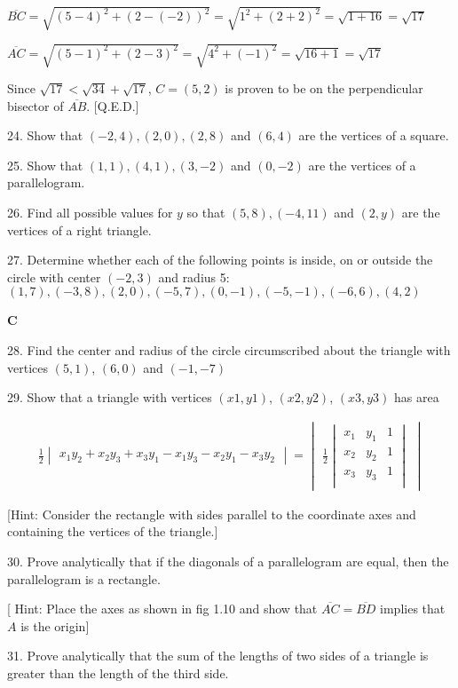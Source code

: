 \documentclass[10pt,letterpaper]{article}
\begin{document}
$\overline{BC}=\sqrt{(5-4)^2+(2-(-2))^2}=\sqrt{1^2+(2+2)^2}=\sqrt{1+16}=\sqrt{17}$

$\overline{AC}=\sqrt{(5-1)^2+(2-3)^2}=\sqrt{4^2+(-1)^2}=\sqrt{16+1}=\sqrt{17}$

Since $\sqrt{17} < \sqrt{34}+\sqrt{17}$, $C=(5,2)$ is proven to be on the perpendicular bisector of $\overline{AB}$. [Q.E.D.]

24. Show that $(-2,4), (2,0), (2,8)$ and $(6,4)$ are the vertices of a square.

25. Show that $(1,1), (4,1), (3,-2)$ and $(0,-2)$ are the vertices of a parallelogram.

26. Find all possible values for $y$ so that $(5,8), (-4,11)$ and $(2,y)$ are the vertices of a right triangle.

27. Determine whether each of the following points is inside, on or outside the circle with center $(-2, 3)$ and radius 5: $(1,7), (-3,8), (2,0), (-5,7), (0,-1), (-5,-1), (-6,6), (4,2)$

\textbf{C}

28. Find the center and radius of the circle circumscribed about the triangle with vertices $(5,1)$, $(6,0)$ and $(-1, -7)$

29. Show that a triangle with vertices $(x1, y1)$, $(x2,y2)$, $(x3, y3)$ has area 

\begin{align}
\frac{1}{2}
\begin{vmatrix}
x_1y_2 +x_2y_3 +x_3y_1 - x_1y_3 -x_2y_1 -x_3y_2
\end{vmatrix}
= 
 \begin{vmatrix}
 \frac{1}{2}
 \begin{vmatrix}
 x_1 & y_1 & 1\\
 x_2 & y_2 & 1\\
 x_3 & y_3 & 1\\
 \end{vmatrix}
 \end{vmatrix}
\end{align}

{}[Hint: Consider the rectangle with sides parallel to the coordinate axes and containing the vertices of the triangle.]

30. Prove analytically that if the diagonals of a parallelogram are equal, then the parallelogram is a rectangle.

{}[ Hint: Place the axes as shown in fig 1.10 and show that $\overline{AC} = \overline{BD}$ implies that $A$ is the origin]

31. Prove analytically that the sum of the lengths of two sides of a triangle is greater than the length of the third side.
\end{document}
